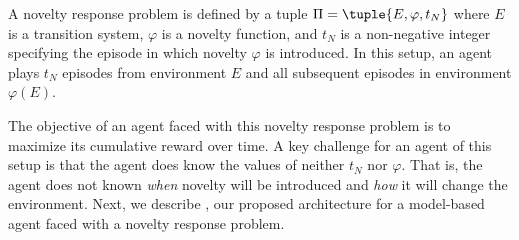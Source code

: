 \documentclass{article}
\begin{document}
\begin{definition}
A novelty response problem is defined by a tuple $\Pi=\tuple{E, \varphi, t_N}$ 
where $E$ is a transition system, $\varphi$ is a novelty function, 
and $t_N$ is a non-negative integer specifying the episode in which novelty $\varphi$ is introduced. 
In this setup, an agent plays $t_N$ episodes from environment $E$ 
and all subsequent episodes in environment $\varphi(E)$. 
\end{definition}

The objective of an agent faced with this novelty response problem is to maximize its cumulative reward over time. 
A key challenge for an agent of this setup is that the agent does know the values of neither $t_N$ nor $\varphi$. 
That is, the agent does not known \emph{when} novelty will be introduced and \emph{how} it will change the environment. Next, we describe \hydra, our proposed architecture for a model-based agent faced with a novelty response problem. 








\end{document}
